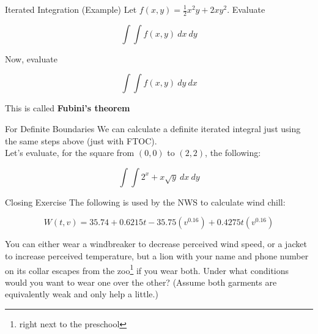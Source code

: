 \documentclass[10pt]{beamer}
\begin{document}
\begin{frame}{Iterated Integration (Example)}
    Let $f(x,y) = \frac{1}{2}x^2y + 2xy^2$. Evaluate

    \[\int \int f(x,y) \: dx \:dy\]

    \pause
    Now, evaluate

    \[\int \int f(x,y) \: dy \:dx\]\pause

    This is called \textbf{Fubini's theorem}
\end{frame}

\begin{frame}{For Definite Boundaries}
    We can calculate a definite iterated integral just using the same steps above (just with FTOC). \\
    
    \vspace{1cm}
    Let's evaluate, for the square from $(0,0)$ to $(2,2)$, the following:

    \[\int \int 2^x + x\sqrt{y} \: dx \: dy\]

    
\end{frame}

\begin{frame}{Closing Exercise}
    The following is used by the NWS to calculate wind chill:

    \[W(t,v) = 35.74 + 0.6215t - 35.75(v^{0.16})+0.4275t(v^{0.16})\]

    You can either wear a windbreaker to decrease perceived wind speed, or a jacket to increase perceived temperature, but a lion with your name and phone number on its collar escapes from the zoo\footnote{right next to the preschool} if you wear both. Under what conditions would you want to wear one over the other? (Assume both garments are equivalently weak and only help a little.)
\end{frame}
\end{document}
